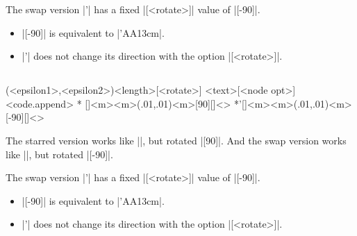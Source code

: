 \begin{tzcode}{.3}
\end{tzcode}

\remark
The swap version |\tznormalat'| has a fixed |[<rotate>]| value of |[-90]|.
\begin{itemize}
\item |[-90]| is equivalent to |\tznormalat'{AA}{1}{3cm}|.
\item |\tznomralat'| does not change its direction with the option |[<rotate>]|.
\end{itemize}


\subsection{\protect{}}
\label{ss:tznormalat*}

\begin{tzdef}
(<epsilon1>,<epsilon2>){<length>}[<rotate>]
          {<text>}[<node opt>]<code.append>
* []{<m>}{<m>}(.01,.01){<m>}[90]{}[]<>
*'[]{<m>}{<m>}(.01,.01){<m>}[-90]{}[]<>
\end{tzdef}

The starred version \icmd{\tznormalat*} works like |\tzslopeat|, but rotated |[90]|.
And the swap version  works like |\tzslopeat|, but rotated |[-90]|.

\remark
The swap version |\tznormalat*'| has a fixed |[<rotate>]| value of |[-90]|.
\begin{itemize}
\item |[-90]| is equivalent to |\tznormalat*'{AA}{1}{3cm}|.
\item |\tznomralat*'| does not change its direction with the option |[<rotate>]|.
\end{itemize}

\begin{tzcode}{.3}
\end{tzcode}


